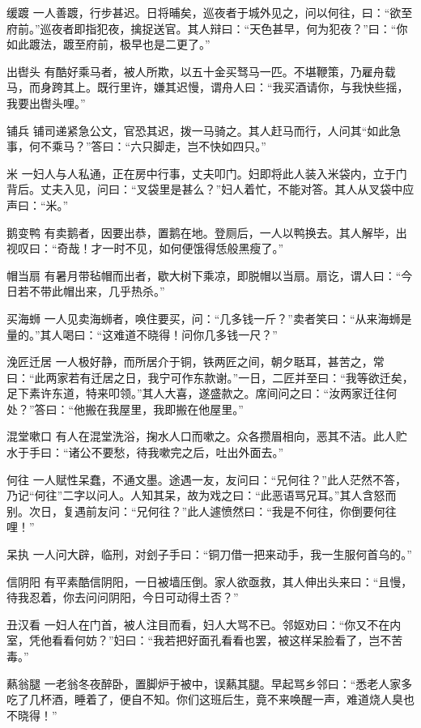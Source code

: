 \documentclass[12pt,UTF8]{ctexbook}
\begin{document}
缓踱
一人善踱，行步甚迟。日将晡矣，巡夜者于城外见之，问以何往，曰：“欲至府前。”巡夜者即指犯夜，擒捉送官。其人辩曰：“天色甚早，何为犯夜？”曰：“你如此踱法，踱至府前，极早也是二更了。”

出辔头
有酷好乘马者，被人所欺，以五十金买驽马一匹。不堪鞭策，乃雇舟载马，而身跨其上。既行里许，嫌其迟慢，谓舟人曰：“我买酒请你，与我快些摇，我要出辔头哩。”

铺兵
铺司递紧急公文，官恐其迟，拨一马骑之。其人赶马而行，人问其“如此急事，何不乘马？”答曰：“六只脚走，岂不快如四只。”

米
一妇人与人私通，正在房中行事，丈夫叩门。妇即将此人装入米袋内，立于门背后。丈夫入见，问曰：“叉袋里是甚么？”妇人着忙，不能对答。其人从叉袋中应声曰：“米。”

鹅变鸭
有卖鹅者，因要出恭，置鹅在地。登厕后，一人以鸭换去。其人解毕，出视叹曰：“奇哉！才一时不见，如何便饿得恁般黑瘦了。”

帽当扇
有暑月带毡帽而出者，歇大树下乘凉，即脱帽以当扇。扇讫，谓人曰：“今日若不带此帽出来，几乎热杀。”

买海蛳
一人见卖海蛳者，唤住要买，问：“几多钱一斤？”卖者笑曰：“从来海蛳是量的。”其人喝曰：“这难道不晓得！问你几多钱一尺？”

浼匠迁居
一人极好静，而所居介于铜，铁两匠之间，朝夕聒耳，甚苦之，常曰：“此两家若有迁居之日，我宁可作东款谢。”一日，二匠并至曰：“我等欲迁矣，足下素许东道，特来叩领。”其人大喜，遂盛款之。席间问之曰：“汝两家迁往何处？”答曰：“他搬在我屋里，我即搬在他屋里。”

混堂嗽口
有人在混堂洗浴，掬水人口而嗽之。众各攒眉相向，恶其不洁。此人贮水于手曰：“诸公不要愁，待我嗽完之后，吐出外面去。”

何往
一人赋性呆蠢，不通文墨。途遇一友，友问曰：“兄何往？”此人茫然不答，乃记“何往”二字以问人。人知其呆，故为戏之曰：“此恶语骂兄耳。”其人含怒而别。次日，复遇前友问：“兄何往？”此人遽愤然曰：“我是不何往，你倒要何往哩！”

呆执
一人问大辟，临刑，对刽子手曰：“铜刀借一把来动手，我一生服何首乌的。”

信阴阳
有平素酷信阴阳，一日被墙压倒。家人欲亟救，其人伸出头来曰：“且慢，待我忍着，你去问问阴阳，今日可动得土否？”

丑汉看
一妇人在门首，被人注目而看，妇人大骂不已。邻妪劝曰：“你又不在内室，凭他看看何妨？”妇曰：“我若把好面孔看看也罢，被这样呆脸看了，岂不苦毒。”

爇翁腿
一老翁冬夜醉卧，置脚炉于被中，误爇其腿。早起骂乡邻曰：“悉老人家多吃了几杯酒，睡着了，便自不知。你们这班后生，竟不来唤醒一声，难道烧人臭也不晓得！”
\end{document}
